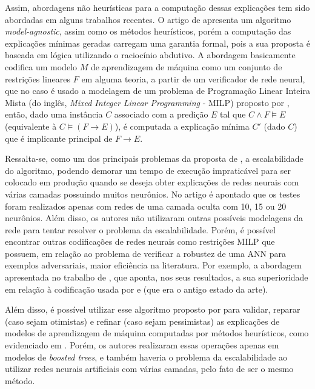 Assim, abordagens não heurísticas para a computação dessas explicações tem sido abordadas em alguns trabalhos recentes. O artigo de  apresenta  um algoritmo \textit{model-agnostic}, assim como os métodos heurísticos, porém a computação das explicações mínimas geradas carregam uma garantia formal, pois a sua proposta é baseada em lógica utilizando o raciocínio abdutivo. A abordagem basicamente codifica um modelo $M$ de aprendizagem de máquina como um conjunto de restrições lineares $F$ em alguma teoria, a partir de um verificador de rede neural, que no caso é usado a modelagem de um problema de Programação Linear Inteira Mista (do inglês, \textit{Mixed Integer Linear Programming} - MILP) proposto por , então, dado uma instância $C$ associado com a predição $E$ tal que $C \wedge F \models E$ (equivalente à $C \models (F \rightarrow E)$), é computada a explicação mínima $C'$ (dado $C$) que é implicante principal de  $F \rightarrow E$.

Ressalta-se, como um dos principais problemas da proposta de , a escalabilidade do algoritmo, podendo demorar um tempo de execução impraticável para ser colocado em produção quando se deseja obter explicações de redes neurais com várias camadas possuindo muitos neurônios. No artigo é apontado que os testes foram realizados apenas com redes de uma camada oculta com 10, 15 ou 20 neurônios. Além disso, os autores não utilizaram outras possíveis modelagens da rede para tentar resolver o problema da escalabilidade. Porém, é possível encontrar outras codificações de redes neurais como restrições MILP que possuem, em relação ao problema de verificar a robustez de uma ANN para exemplos adversariais, maior eficiência na literatura. Por exemplo, a abordagem apresentada no trabalho de , que aponta, nos seus resultados, a sua superioridade em relação à codificação usada por  e  (que era o antigo estado da arte). 

Além disso, é possível utilizar esse algoritmo proposto por  para validar, reparar (caso sejam otimistas) e refinar (caso sejam pessimistas) as explicações de modelos de aprendizagem de máquina computadas por métodos heurísticos, como evidenciado em . Porém, os autores realizaram essas operações apenas em modelos de \textit{boosted trees}, e também haveria o problema da escalabilidade ao utilizar redes neurais artificiais com várias camadas, pelo fato de ser o mesmo método. 

